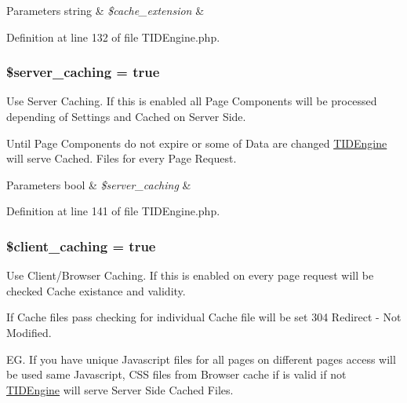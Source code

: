 \begin{DoxyParams}[1]{Parameters}
string & {\em \$cache\_\-extension} & \\
\hline
\end{DoxyParams}


Definition at line 132 of file TIDEngine.php.

\hypertarget{group__general__cache__settings_ga94cbab658bf158b39afd90db1a44e581}{
\subsubsection[{\$server\_\-caching}]{\setlength{\rightskip}{0pt plus 5cm}\$server\_\-caching = true}}
\label{group__general__cache__settings_ga94cbab658bf158b39afd90db1a44e581}
Use Server Caching. If this is enabled all Page Components will be processed depending of Settings and Cached on Server Side.\par
 Until Page Components do not expire or some of Data are changed \hyperlink{class_t_i_d_engine}{TIDEngine} will serve Cached. Files for every Page Request.\par



\begin{DoxyParams}[1]{Parameters}
bool & {\em \$server\_\-caching} & \\
\hline
\end{DoxyParams}


Definition at line 141 of file TIDEngine.php.

\hypertarget{group__general__cache__settings_gaa239a3baf57ffc17ad1cc1911414b539}{
\subsubsection[{\$client\_\-caching}]{\setlength{\rightskip}{0pt plus 5cm}\$client\_\-caching = true}}
\label{group__general__cache__settings_gaa239a3baf57ffc17ad1cc1911414b539}
Use Client/Browser Caching. If this is enabled on every page request will be checked Cache existance and validity.\par
\par
 If Cache files pass checking for individual Cache file will be set 304 Redirect -\/ Not Modified.\par
\par
 EG. If you have unique Javascript files for all pages on different pages access will be used same Javascript, CSS files from Browser cache if is valid if not \hyperlink{class_t_i_d_engine}{TIDEngine} will serve Server Side Cached Files.\par



